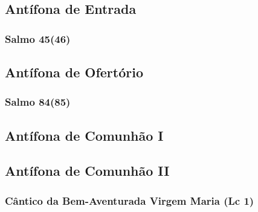 \subsection{Antífona de Entrada}
\nopagebreak


\subsubsection{Salmo 45(46)}
\nopagebreak


\subsection{Antífona de Ofertório}
\nopagebreak


\subsubsection{Salmo 84(85)}
\nopagebreak


\AllowPageFlush

\subsection{Antífona de Comunhão I}
\nopagebreak


\subsection{Antífona de Comunhão II}
\nopagebreak


\subsubsection{Cântico da Bem-Aventurada Virgem Maria (Lc 1)}
\nopagebreak
